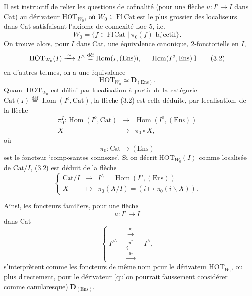 \documentclass[11pt]{article}
\newcommand{\printedpage}[1]{\marginpar{\footnotesize p.~#1}}
\newcommand{\msp}[1]{\marginpar{\footnotesize [#1]}}
\newcommand{\Hom}{\operatorname{Hom}}
\newcommand{\HOT}{\mathrm{HOT}}
\newcommand{\Cat}{\mathrm{Cat}}
\newcommand{\Fl}{\mathrm{Fl}}
\newcommand{\Ens}{\mathrm{Ens}}
\newcommand{\def}{\overset{\text{déf}}{=}}
\newcommand{\pl}{{}}
\begin{document}
Il est instructif de relier les questions de cofinalité (pour une flèche $u : I' \longrightarrow I$ dans Cat) au dérivateur $\HOT_{W_0}$, où $W_0 \subseteq \Fl\,\Cat$ est le plus grossier des localiseurs dans Cat satisfaisant l'axiome de connexité Loc 5, i.e.
\[
W_0 = \{ f \in \Fl\,\Cat \mid \pi_0(f) \text{ bijectif}\}. \tag*{(3.1)}
\]
On trouve alors, pour $I$ dans Cat, une équivalence canonique, 2-fonctorielle en $I$,
\[
\HOT_{W_0}(I) \xrightarrow{\;\sim\;} I^{\wedge} \def \Hom(I,(\Ens)), \quad \text{\pl}\ \Hom(I^o,\Ens)\,\text{\texttt{]}} \tag*{(3.2)}
\]
en d'autres termes, on a une équivalence
\[
\HOT_{W_0} \simeq \mathbf{D}_{(\Ens)}. \tag*{(3.3)}
\]
Quand $\HOT_{W_0}$ est défini par localisation à partir de la catégorie $\Cat(I) \def \Hom(I^o,\Cat)$, la flèche (3.2) est celle déduite, par localisation, de la flèche
\[
\begin{array}{rcl}
\pi_0^I : \Hom(I^o,\Cat) & \longrightarrow & \Hom(I^o,(\Ens)) \\[1ex]
X & \longmapsto & \pi_0 \circ X,
\end{array} \tag*{(3.4)}
\]
où
\[
\pi_0 : \Cat \longrightarrow (\Ens) \tag*{(3.5)}
\]
est le foncteur ‘composantes connexes’. Si on décrit $\HOT_{W_0}(I)$ comme localisée de $\Cat/I$, (3.2) est déduit de la flèche
\[
\left\{
\begin{array}{rcl}
\Cat/I & \longrightarrow & I^{\wedge} = \Hom(I^o,(\Ens)) \\[1ex]
X & \longmapsto & \pi_0(X/I) = (i \longmapsto \pi_0(i\backslash X)).
\end{array}
\right. \tag*{(3.6)}
\]

\msp{page 38}
Ainsi, les foncteurs familiers, pour une flèche
\[
u : I' \longrightarrow I
\]
dans Cat
\[
\left\{
\; I'^{\wedge} \quad
\begin{array}{c}
\xrightarrow{\;u_!\;} \\[1.5ex]
\xleftarrow{\;u^*\;} \\[1.5ex]
\xrightarrow{\;u_*\;}
\end{array}
\quad I^{\wedge},
\right. \tag*{(3.7)}
\]
\printedpage{25}
s'interprètent comme les foncteurs de même nom pour le dérivateur $\HOT_{W_0}$, ou plus directement, pour le dérivateur (qu'on pourrait faussement considérer comme canularesque) $\mathbf{D}_{(\Ens)}$.
\end{document}
